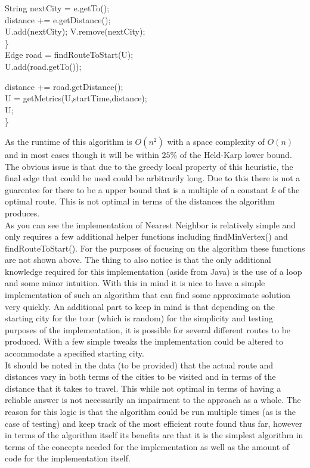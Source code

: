 \documentclass[midd]{thesis}
\newcommand{\tab}{\hspace*{2em}}
\begin{document}
\begin{codebox}
\tab\tab String nextCity = e.getTo();\\
\tab\tab distance += e.getDistance();\\
\tab\tab U.add(nextCity); V.remove(nextCity);\\
\tab\}\\\End
\tab Edge road = findRouteToStart(U);\\
\tab U.add(road.getTo());\\
\end{codebox}
\begin{codebox}
\tab distance += road.getDistance();\\
\tab U = getMetrics(U,startTime,distance);\\
\tab \Return U;\\
\}
\end{codebox}
As the runtime of this algorithm is $O(n^2)$\cite{htspc} with a space complexity of $O(n)$ and in most cases though it will be within $25\%$ of the Held-Karp lower bound\cite{htspc}. The obvious issue is that due to the greedy local property of this heuristic, the final edge that could be used could be arbitrarily long. Due to this there is not a guarentee for there to be a upper bound that is a multiple of a constant $k$ of the optimal route. This is not optimal in terms of the distances the algorithm produces.\\
\tab As you can see the implementation of Nearest Neighbor is relatively simple and only requires a few additional helper functions including findMinVertex() and\\ findRouteToStart(). For the purposes of focusing on the algorithm these functions are not shown above. The thing to also notice is that the only additional knowledge required for this implementation (aside from Java) is the use of a loop and some minor intuition. With this in mind it is nice to have a simple implementation of such an algorithm that can find some approximate solution very quickly. An additional part to keep in mind is that depending on the starting city for the tour (which is random) for the simplicity and testing purposes of the implementation, it is possible for several different routes to be produced. With a few simple tweaks the implementation could be altered to accommodate a specified starting city. \\
\tab It should be noted in the data (to be provided) that the actual route and distances vary in both terms of the cities to be visited and in terms of the distance that it takes to travel. This while not optimal in terms of having a reliable answer is not necessarily an impairment to the approach as a whole. The reason for this logic is that the algorithm could be run multiple times (as is the case of testing) and keep track of the most efficient route found thus far, however in terms of the algorithm itself its benefits are that it is the simplest algorithm in terms of the concepts needed for the implementation as well as the amount of code for the implementation itself.
\end{document}
